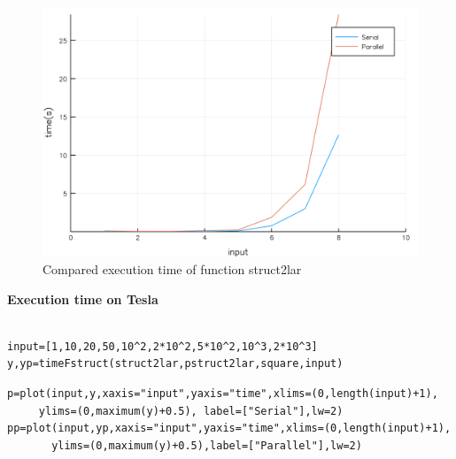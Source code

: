 \documentclass[a4paper,12pt]{article}
\begin{document}
\begin{figure}[!h]
\centering
\includegraphics[scale=0.08]{struct2larC.png}
\caption{Compared execution time of function struct2lar}
\end{figure}
\vspace{20px}

\noindent\textbf{Execution time on Tesla}
\begin{Verbatim}[fontsize=\footnotesize]

input=[1,10,20,50,10^2,2*10^2,5*10^2,10^3,2*10^3]
y,yp=timeFstruct(struct2lar,pstruct2lar,square,input)

\end{Verbatim}

\newpage

\begin{Verbatim}[fontsize=\footnotesize]
p=plot(input,y,xaxis="input",yaxis="time",xlims=(0,length(input)+1),
     ylims=(0,maximum(y)+0.5), label=["Serial"],lw=2)
pp=plot(input,yp,xaxis="input",yaxis="time",xlims=(0,length(input)+1),
       ylims=(0,maximum(y)+0.5),label=["Parallel"],lw=2)
\end{Verbatim}
\end{document}
